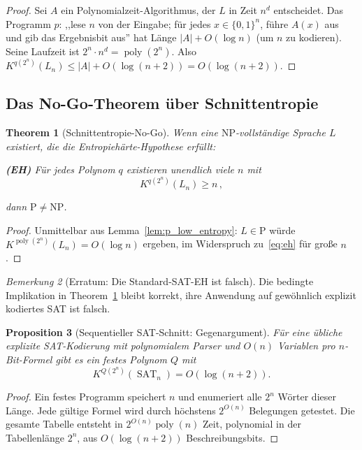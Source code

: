 \documentclass[aps,prd,twocolumn,superscriptaddress,nofootinbib]{revtex4-2}
\newtheorem{theorem}{Theorem}[section]
\newtheorem{proposition}[theorem]{Proposition}
\theoremstyle{definition}
\theoremstyle{remark}
\newtheorem{remark}[theorem]{Bemerkung}
\DeclareMathOperator{\poly}{poly}
\DeclareMathOperator{\SAT}{SAT}
\newcommand{\NP}{\mathrm{NP}}
\newcommand{\PP}{\mathrm{P}}
\begin{document}
\begin{proof}
Sei $A$ ein Polynomialzeit-Algorithmus, der $L$ in Zeit $n^d$ entscheidet. Das Programm $p$: ,,lese $n$ von der Eingabe; für jedes $x \in \{0,1\}^n$, führe $A(x)$ aus und gib das Ergebnisbit aus'' hat Länge $|A| + O(\log n)$ (um $n$ zu kodieren). Seine Laufzeit ist $2^n \cdot n^d = \poly(2^n)$. Also $K^{q(2^n)}(L_n) \leq |A|+O(\log(n+2))=O(\log(n+2))$.
\end{proof}

\subsection{Das No-Go-Theorem über Schnittentropie}

\begin{theorem}[Schnittentropie-No-Go]
\label{thm:slice_nogo}
Wenn eine $\NP$-vollständige Sprache $L$ existiert, die die \textit{Entropiehärte-Hypothese} erfüllt:

\textbf{(EH)} Für jedes Polynom $q$ existieren unendlich viele $n$ mit
\begin{equation}
K^{q(2^n)}(L_n) \geq n\,,
\label{eq:eh}
\end{equation}

dann $\PP \neq \NP$.
\end{theorem}

\begin{proof}
Unmittelbar aus Lemma~\ref{lem:p_low_entropy}: $L \in \PP$ würde $K^{\poly(2^n)}(L_n) = O(\log n)$ ergeben, im Widerspruch zu~\eqref{eq:eh} für große $n$.
\end{proof}

\begin{remark}[Erratum: Die Standard-SAT-EH ist falsch]
Die bedingte Implikation in Theorem~\ref{thm:slice_nogo} bleibt
korrekt, ihre Anwendung auf gewöhnlich explizit kodiertes SAT ist falsch.
\end{remark}
\begin{proposition}[Sequentieller SAT-Schnitt: Gegenargument]
\label{prop:sat-slice-counterexample}
Für eine übliche explizite SAT-Kodierung mit polynomialem Parser
und $O(n)$ Variablen pro $n$-Bit-Formel gibt es ein festes
Polynom $Q$ mit
\[
K^{Q(2^n)}(\SAT_n)=O(\log(n+2)).
\]
\end{proposition}
\begin{proof}
Ein festes Programm speichert $n$ und enumeriert alle $2^n$
Wörter dieser Länge. Jede gültige Formel wird durch höchstens
$2^{O(n)}$ Belegungen getestet. Die gesamte Tabelle entsteht
in $2^{O(n)}\poly(n)$ Zeit, polynomial in der Tabellenlänge
$2^n$, aus $O(\log(n+2))$ Beschreibungsbits.
\end{proof}
\end{document}
